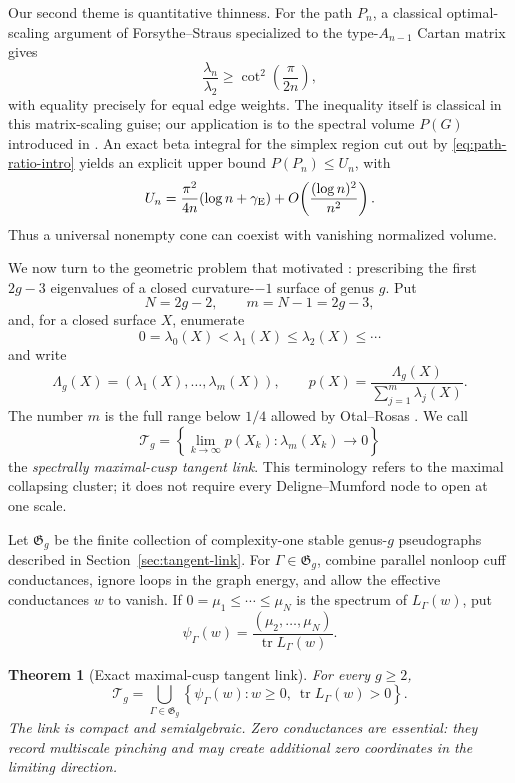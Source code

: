 \documentclass[11pt,reqno]{amsart}
\newtheorem{theorem}{Theorem}[section]
\theoremstyle{definition}
\theoremstyle{remark}
\newcommand{\tr}{\operatorname{tr}}
\begin{document}
Our second theme is quantitative thinness.  For the path $P_n$, a classical
optimal-scaling argument of Forsythe--Straus \cite{ForsytheStraus1955}
specialized to the type-$A_{n-1}$ Cartan matrix gives
\begin{equation}\label{eq:path-ratio-intro}
  \frac{\lambda_n}{\lambda_2}
  \ge \cot^2\!\left(\frac{\pi}{2n}\right),
\end{equation}
with equality precisely for equal edge weights.  The inequality itself is
classical in this matrix-scaling guise; our application is to the spectral
volume $P(G)$ introduced in \cite{EJT2026}.  An exact beta integral for the
simplex region cut out by \eqref{eq:path-ratio-intro} yields an explicit
upper bound $P(P_n)\le U_n$, with
\[
 U_n=\frac{\pi^2}{4n}(\log n+\gamma_{\rm E})
 +O\!\left(\frac{(\log n)^2}{n^2}\right).
\]
Thus a universal nonempty cone can coexist with vanishing normalized volume.

We now turn to the geometric problem that motivated \cite{EJT2026}:
prescribing the first $2g-3$ eigenvalues of a closed curvature-$-1$ surface
of genus $g$.  Put
\[
 N=2g-2,\qquad m=N-1=2g-3,
\]
and, for a closed surface $X$, enumerate
\[
 0=\lambda_0(X)<\lambda_1(X)\le\lambda_2(X)\le\cdots
\]
and write
\[
 \Lambda_g(X)=(\lambda_1(X),\ldots,\lambda_m(X)),
 \qquad p(X)=\frac{\Lambda_g(X)}{\sum_{j=1}^m\lambda_j(X)}.
\]
The number $m$ is the full range below $1/4$ allowed by Otal--Rosas
\cite{OtalRosas2009}.  We call
\[
 \mathcal T_g=
 \left\{\lim_{k\to\infty}p(X_k):
       \lambda_m(X_k)\longrightarrow0\right\}
\]
the \emph{spectrally maximal-cusp tangent link}.  This terminology refers to
the maximal collapsing cluster; it does not require every Deligne--Mumford
node to open at one scale.

Let $\mathfrak G_g$ be the finite collection of complexity-one stable
genus-$g$ pseudographs described in Section~\ref{sec:tangent-link}.  For
$\Gamma\in\mathfrak G_g$, combine parallel nonloop cuff conductances, ignore
loops in the graph energy, and allow the effective conductances $w$ to vanish.
If $0=\mu_1\le\cdots\le\mu_N$ is the spectrum of $L_\Gamma(w)$, put
\[
 \psi_\Gamma(w)=
 \frac{(\mu_2,\ldots,\mu_N)}{\tr L_\Gamma(w)}.
\]

\begin{theorem}[Exact maximal-cusp tangent link]\label{thm:intro-link}
For every $g\ge2$,
\[
 \mathcal T_g=
 \bigcup_{\Gamma\in\mathfrak G_g}
 \left\{\psi_\Gamma(w):w\ge0,\ \tr L_\Gamma(w)>0\right\}.
\]
The link is compact and semialgebraic.  Zero conductances are essential: they
record multiscale pinching and may create additional zero coordinates in the
limiting direction.
\end{theorem}
\end{document}
